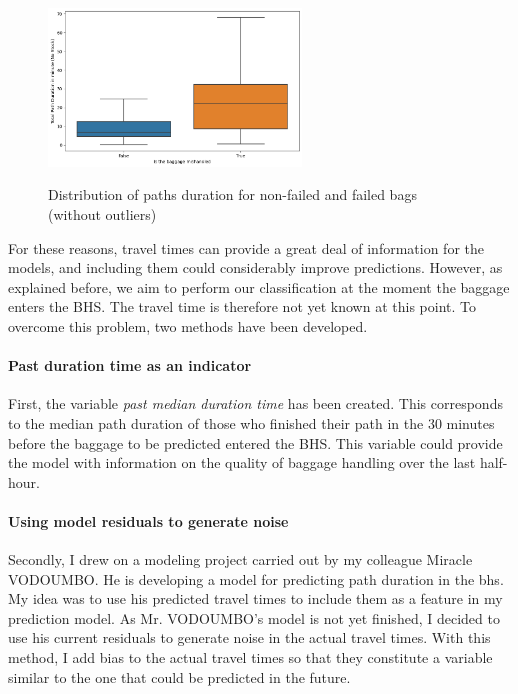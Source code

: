 \documentclass[12pt]{article}
\begin{document}
\begin{figure}[h]
    \centering
    \includegraphics[width=0.6\textwidth]{Boxplot path duration per failed status.png}\\
    \caption{Distribution of paths duration for non-failed and failed bags (without outliers)}
    \label{fig:Distribution of paths duration for non-failed and failed bags}
\end{figure}
\FloatBarrier

For these reasons, travel times can provide a great deal of information for the models, and including them could considerably improve predictions. However, as explained before, we aim to perform our classification at the moment the baggage enters the BHS. The travel time is therefore not yet known at this point. 
To overcome this problem, two methods have been developed.

\paragraph{Past duration time as an indicator} First, the variable \textit{past median duration time} has been created. This corresponds to the median path duration of those who finished their path in the 30 minutes before the baggage to be predicted entered the BHS. This variable could provide the model with information on the quality of baggage handling over the last half-hour.


\paragraph{Using model residuals to generate noise} Secondly, I drew on a modeling project carried out by my colleague Miracle VODOUMBO. He is developing a model for predicting path duration in the \acrshort{bhs}. My idea was to use his predicted travel times to include them as a feature in my prediction model. As Mr. VODOUMBO's model is not yet finished, I decided to use his current residuals to generate noise in the actual travel times. With this method, I add bias to the actual travel times so that they constitute a variable similar to the one that could be predicted in the future. \hfill \break
\end{document}
